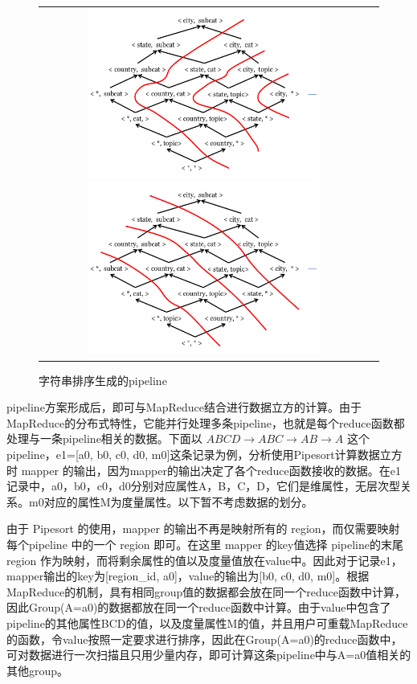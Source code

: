 \begin{figure}[!htb]
\begin{tabular}{cc}

\begin{minipage}[t]{0.5\textwidth}
\centering\includegraphics[width=3in]{picture/ch_terasort_mr/greedy_pipeline} 
\caption{随机贪心生成的pipeline}\label{greedy_pipeline} 
\end{minipage}

\begin{minipage}[t]{0.5\textwidth}
\centering\includegraphics[width=3in]{picture/ch_terasort_mr/sort_pipeline} 
\caption{字符串排序生成的pipeline}\label{sort_pipeline} 
\end{minipage}

\end{tabular}
\end{figure}

pipeline方案形成后，即可与MapReduce结合进行数据立方的计算。由于MapReduce的分布式特性，它能并行处理多条pipeline，也就是每个reduce函数都处理与一条pipeline相关的数据。下面以 $ABCD\rightarrow ABC\rightarrow AB\rightarrow A$ 这个pipeline，e1=[a0, b0, c0, d0, m0]这条记录为例，分析使用Pipesort计算数据立方时 mapper 的输出，因为mapper的输出决定了各个reduce函数接收的数据。在e1 记录中，a0，b0，c0，d0分别对应属性A，B，C，D，它们是维属性，无层次型关系。m0对应的属性M为度量属性。以下暂不考虑数据的划分。

由于 Pipesort 的使用，mapper 的输出不再是映射所有的 region，而仅需要映射 每个pipeline 中的一个 region 即可。在这里 mapper 的key值选择 pipeline的末尾region 作为映射，而将剩余属性的值以及度量值放在value中。因此对于记录e1，mapper输出的key为[region\_id, a0]，value的输出为[b0, c0, d0, m0]。根据MapReduce的机制，具有相同group值的数据都会放在同一个reduce函数中计算，因此Group(A=a0)的数据都放在同一个reduce函数中计算。由于value中包含了pipeline的其他属性BCD的值，以及度量属性M的值，并且用户可重载MapReduce的函数，令value按照一定要求进行排序，因此在Group(A=a0)的reduce函数中，可对数据进行一次扫描且只用少量内存，即可计算这条pipeline中与A=a0值相关的其他group。

